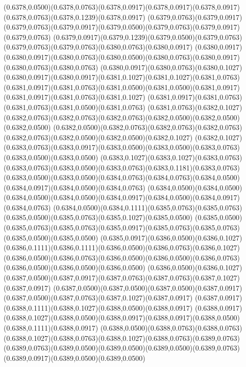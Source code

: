 (0.6378,0.0500)(0.6378,0.0763)(0.6378,0.0917)(0.6378,0.0917)(0.6378,0.0917)(0.6378,0.0763)(0.6378,0.1239)(0.6378,0.0917)
(0.6379,0.0763)(0.6379,0.0917)(0.6379,0.0763)(0.6379,0.0917)(0.6379,0.0500)(0.6379,0.0763)(0.6379,0.0917)(0.6379,0.0763)
(0.6379,0.0917)(0.6379,0.1239)(0.6379,0.0500)(0.6379,0.0763)(0.6379,0.0763)(0.6379,0.0763)(0.6380,0.0763)(0.6380,0.0917)
(0.6380,0.0917)(0.6380,0.0917)(0.6380,0.0763)(0.6380,0.0500)(0.6380,0.0763)(0.6380,0.0917)(0.6380,0.0763)(0.6380,0.0763)
(0.6380,0.0917)(0.6380,0.0763)(0.6380,0.1027)(0.6380,0.0917)(0.6380,0.0917)(0.6381,0.1027)(0.6381,0.1027)(0.6381,0.0763)
(0.6381,0.0917)(0.6381,0.0763)(0.6381,0.0500)(0.6381,0.0500)(0.6381,0.0917)(0.6381,0.0917)(0.6381,0.0763)(0.6381,0.1027)
(0.6381,0.0917)(0.6381,0.0763)(0.6381,0.0763)(0.6381,0.0500)(0.6381,0.0763)
\PST@Solid(0.6381,0.0763)(0.6382,0.1027)(0.6382,0.0763)(0.6382,0.0763)(0.6382,0.0763)(0.6382,0.0500)(0.6382,0.0500)(0.6382,0.0500)
(0.6382,0.0500)(0.6382,0.0763)(0.6382,0.0763)(0.6382,0.0763)(0.6382,0.0763)(0.6382,0.0500)(0.6382,0.0500)(0.6382,0.1027)
(0.6382,0.1027)(0.6383,0.0763)(0.6383,0.0917)(0.6383,0.0500)(0.6383,0.0500)(0.6383,0.0763)(0.6383,0.0500)(0.6383,0.0500)
(0.6383,0.1027)(0.6383,0.1027)(0.6383,0.0763)(0.6383,0.0763)(0.6383,0.0500)(0.6383,0.0763)(0.6383,0.1181)(0.6383,0.0763)
(0.6383,0.0500)(0.6383,0.0500)(0.6384,0.0763)(0.6384,0.0763)(0.6384,0.0500)(0.6384,0.0917)(0.6384,0.0500)(0.6384,0.0763)
(0.6384,0.0500)(0.6384,0.0500)(0.6384,0.0500)(0.6384,0.0500)(0.6384,0.0917)(0.6384,0.0500)(0.6384,0.0917)(0.6384,0.0763)
(0.6384,0.0500)(0.6384,0.1111)(0.6385,0.0763)(0.6385,0.0763)(0.6385,0.0500)(0.6385,0.0763)(0.6385,0.1027)(0.6385,0.0500)
(0.6385,0.0500)(0.6385,0.0763)(0.6385,0.0763)(0.6385,0.0917)(0.6385,0.0763)(0.6385,0.0763)(0.6385,0.0500)(0.6385,0.0500)
(0.6385,0.0917)(0.6386,0.0500)(0.6386,0.1027)(0.6386,0.1111)(0.6386,0.1111)(0.6386,0.0500)(0.6386,0.0763)(0.6386,0.1027)
(0.6386,0.0500)(0.6386,0.0763)(0.6386,0.0500)(0.6386,0.0500)(0.6386,0.0763)(0.6386,0.0500)(0.6386,0.0500)(0.6386,0.0500)
(0.6386,0.0500)(0.6386,0.1027)(0.6387,0.0500)(0.6387,0.0917)(0.6387,0.0763)(0.6387,0.0763)(0.6387,0.1027)(0.6387,0.0917)
(0.6387,0.0500)(0.6387,0.0500)(0.6387,0.0500)(0.6387,0.0917)(0.6387,0.0500)(0.6387,0.0763)(0.6387,0.1027)(0.6387,0.0917)
(0.6387,0.0917)(0.6388,0.1111)(0.6388,0.1027)(0.6388,0.0500)(0.6388,0.0917)
\PST@Solid(0.6388,0.0917)(0.6388,0.1027)(0.6388,0.0500)(0.6388,0.0917)(0.6388,0.0917)(0.6388,0.0500)(0.6388,0.1111)(0.6388,0.0917)
(0.6388,0.0500)(0.6388,0.0763)(0.6388,0.0763)(0.6388,0.1027)(0.6388,0.0763)(0.6388,0.1027)(0.6388,0.0763)(0.6389,0.0763)
(0.6389,0.0763)(0.6389,0.0500)(0.6389,0.0500)(0.6389,0.0500)(0.6389,0.0763)(0.6389,0.0917)(0.6389,0.0500)(0.6389,0.0500)
